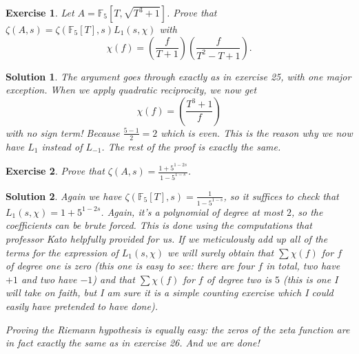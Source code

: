 \documentclass{article}
\newtheorem{ex}{Exercise}
\theoremstyle{nonumberplain}
\newtheorem{sol}{Solution}
\newcommand{\FF}{\mathbb{F}}
\newcommand{\legendre}[2]{\genfrac{(}{)}{}{}{#1}{#2}}
\begin{document}
\begin{ex}
Let $A = \FF_5[T,\sqrt{T^3+1}]$. Prove that $\zeta(A,s) = \zeta(\FF_5[T],s) L_1(s,\chi)$ with
\begin{equation}
\chi(f) = \legendre f{T+1} \legendre f{T^2 - T + 1}.
\end{equation}
\end{ex}

\begin{sol}
The argument goes through exactly as in exercise 25, with one major exception. When we apply quadratic reciprocity, we now get
\begin{equation}
\chi(f) = \legendre{T^3 + 1}f
\end{equation}
with no sign term! Because $\frac{5-1}2 = 2$ which is even. This is the reason why we now have $L_1$ instead of $L_{-1}$. The rest of the proof is exactly the same.
\end{sol}

\begin{ex}
Prove that $\zeta(A,s) = \frac{1+5^{1-2s}}{1-5^{1-s}}$.
\end{ex}

\begin{sol}
Again we have $\zeta(\FF_5[T], s) = \frac1{1-5^{1-s}}$, so it suffices to check that $L_1(s,\chi) = 1 + 5^{1-2s}$. Again, it's a polynomial of degree at most $2$, so the coefficients can be brute forced. This is done using the computations that professor Kato helpfully provided for us. If we meticulously add up all of the terms for the expression of $L_1(s,\chi)$ we will surely obtain that $\sum \chi(f)$ for $f$ of degree one is zero (this one is easy to see: there are four $f$ in total, two have $+1$ and two have $-1$) and that $\sum \chi(f)$ for $f$ of degree two is $5$ (this is one I will take on faith, but I am sure it is a simple counting exercise which I could easily have pretended to have done).

Proving the Riemann hypothesis is equally easy: the zeros of the zeta function are in fact exactly the same as in exercise 26. And we are done!
\end{sol}
\end{document}
